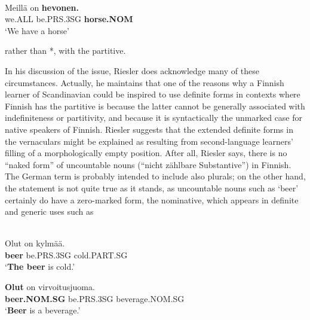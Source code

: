 
\ea \label{} 
\\
\gll Meillä  on  \textbf{hevonen.} \\
we.ALL  be.PRS.3SG  \textbf{horse.NOM} \\
\glt ‘We have a horse’

\z

rather than *, with the partitive.


In his discussion of the issue, Riesler does acknowledge many of these circumstances. Actually, he maintains that one of the reasons why a Finnish learner of Scandinavian could be inspired to use definite forms in contexts where Finnish has the partitive is because the latter cannot be generally associated with indefiniteness or partitivity, and because it is syntactically the unmarked case for native speakers of Finnish. Riesler suggests that the extended definite forms in the vernaculars might be explained as resulting from second-language learners’ filling of a morphologically empty position. After all, Riesler says, there is no “naked form” of uncountable nouns (“nicht zählbare Substantive”) in Finnish. The German term is probably intended to include also plurals; on the other hand, the statement is not quite true as it stands, as uncountable nouns such as  ‘beer’ certainly do have a zero-marked form, the nominative, which appears in definite and generic uses such as


\ea\label{}
\\
\gll Olut  on\textsuperscript{  }kylmää.\\
\textbf{beer} be.PRS.3SG  cold.PART.SG\\
\glt ‘\textbf{The beer} is cold.’

\z

\ea
\gll \textbf{Olut} on  virvoitusjuoma.\\
\textbf{beer.NOM.SG} be.PRS.3SG  beverage.NOM.SG\\
\glt ‘\textbf{Beer} is a beverage.’

\z

